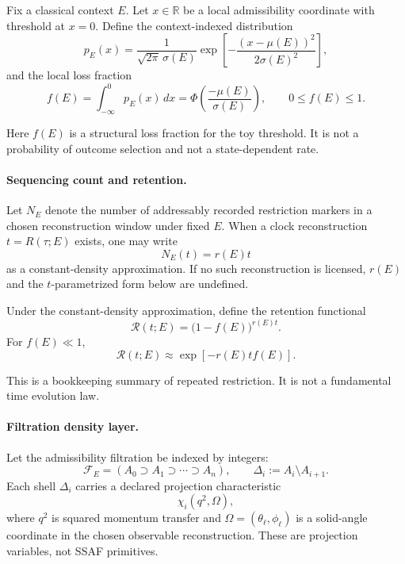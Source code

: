 \documentclass[aps,prx,onecolumn,11pt]{revtex4-2}
\theoremstyle{plain}
\theoremstyle{definition}
\theoremstyle{remark}
\begin{document}
Fix a classical context \(E\). Let \(x\in\mathbb R\) be a local
admissibility coordinate with threshold at \(x=0\). Define the
context-indexed distribution
\begin{equation}
p_E(x)
=
\frac{1}{\sqrt{2\pi}\,\sigma(E)}
\exp\!\left[
-\frac{(x-\mu(E))^2}{2\sigma(E)^2}
\right],
\label{eq:toy_unified_pE}
\end{equation}
and the local loss fraction
\begin{equation}
f(E)
=
\int_{-\infty}^{0}p_E(x)\,dx
=
\Phi\!\left(\frac{-\mu(E)}{\sigma(E)}\right),
\qquad
0\leq f(E)\leq 1.
\label{eq:toy_unified_fE}
\end{equation}

Here \(f(E)\) is a structural loss fraction for the toy threshold. It
is not a probability of outcome selection and not a state-dependent
rate.

\paragraph{Sequencing count and retention.}

Let \(N_E\) denote the number of addressably recorded restriction
markers in a chosen reconstruction window under fixed \(E\). When a
clock reconstruction \(t=R(\tau;E)\) exists, one may write
\[
N_E(t)=r(E)t
\]
as a constant-density approximation. If no such reconstruction is
licensed, \(r(E)\) and the \(t\)-parametrized form below are undefined.

Under the constant-density approximation, define the retention
functional
\begin{equation}
\mathcal R(t;E)
=
\bigl(1-f(E)\bigr)^{r(E)t}.
\label{eq:toy_unified_retention}
\end{equation}
For \(f(E)\ll 1\),
\begin{equation}
\mathcal R(t;E)
\approx
\exp[-r(E)t f(E)].
\label{eq:toy_unified_retention_approx}
\end{equation}

This is a bookkeeping summary of repeated restriction. It is not a
fundamental time evolution law.

\paragraph{Filtration density layer.}

Let the admissibility filtration be indexed by integers:
\begin{equation}
\mathcal F_E
=
(A_0\supset A_1\supset\cdots\supset A_n),
\qquad
\Delta_i:=A_i\setminus A_{i+1}.
\label{eq:toy_unified_filtration}
\end{equation}
Each shell \(\Delta_i\) carries a declared projection characteristic
\[
\chi_i(q^2,\Omega),
\]
where \(q^2\) is squared momentum transfer and
\(\Omega=(\theta_\ell,\phi_\ell)\) is a solid-angle coordinate in the
chosen observable reconstruction. These are projection variables, not
SSAF primitives.
\end{document}
